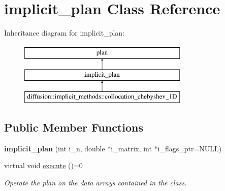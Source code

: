 \hypertarget{classimplicit__plan}{\section{implicit\-\_\-plan Class Reference}
\label{classimplicit__plan}
}
Inheritance diagram for implicit\-\_\-plan\-:\begin{figure}[H]
\begin{center}
\leavevmode
\includegraphics[height=3.000000cm]{classimplicit__plan}
\end{center}
\end{figure}
\subsection*{Public Member Functions}
\begin{DoxyCompactItemize}
\item 
\hypertarget{classimplicit__plan_a9bbe1b969e2b7953aa67deded3bbc9da}{{\bfseries implicit\-\_\-plan} (int i\-\_\-n, double $\ast$i\-\_\-matrix, int $\ast$i\-\_\-flags\-\_\-ptr=N\-U\-L\-L)}\label{classimplicit__plan_a9bbe1b969e2b7953aa67deded3bbc9da}

\item 
virtual void \hyperlink{classplan_a2aaf5789c18317995b2eaf168e839fb5}{execute} ()=0
\begin{DoxyCompactList}\small\item\em Operate the plan on the data arrays contained in the class. \end{DoxyCompactList}\end{DoxyCompactItemize}
